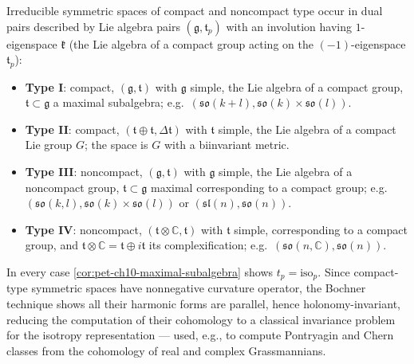 \begin{definition}
  \label{def:pet-ch10-symmetric-space-type-I-IV}
  Irreducible symmetric spaces of compact and noncompact type occur in dual
  pairs described by Lie algebra pairs $(\mathfrak g,\mathfrak t_p)$ with an
  involution having $1$-eigenspace $\mathfrak k$ (the Lie algebra of a compact
  group acting on the $(-1)$-eigenspace $\mathfrak t_p$):
  \begin{itemize}
    \item \textbf{Type I}: compact, $(\mathfrak g,\mathfrak t)$ with $\mathfrak g$
      simple, the Lie algebra of a compact group, $\mathfrak t\subset\mathfrak g$
      a maximal subalgebra; e.g.\ $(\mathfrak{so}(k+l),\mathfrak{so}(k)\times\mathfrak{so}(l))$.
    \item \textbf{Type II}: compact, $(\mathfrak t\oplus\mathfrak t,\Delta\mathfrak t)$
      with $\mathfrak t$ simple, the Lie algebra of a compact Lie group $G$; the
      space is $G$ with a biinvariant metric.
    \item \textbf{Type III}: noncompact, $(\mathfrak g,\mathfrak t)$ with
      $\mathfrak g$ simple, the Lie algebra of a noncompact group,
      $\mathfrak t\subset\mathfrak g$ maximal corresponding to a compact group;
      e.g.\ $(\mathfrak{so}(k,l),\mathfrak{so}(k)\times\mathfrak{so}(l))$ or
      $(\mathfrak{sl}(n),\mathfrak{so}(n))$.
    \item \textbf{Type IV}: noncompact, $(\mathfrak t\otimes\mathbb C,\mathfrak t)$
      with $\mathfrak t$ simple, corresponding to a compact group, and
      $\mathfrak t\otimes\mathbb C=\mathfrak t\oplus i\mathfrak t$ its
      complexification; e.g.\ $(\mathfrak{so}(n,\mathbb C),\mathfrak{so}(n))$.
  \end{itemize}
  In every case \cref{cor:pet-ch10-maximal-subalgebra} shows $t_p=\mathrm{iso}_p$.
  Since compact-type symmetric spaces have nonnegative curvature operator, the
  Bochner technique shows all their harmonic forms are parallel, hence
  holonomy-invariant, reducing the computation of their cohomology to a
  classical invariance problem for the isotropy representation — used, e.g., to
  compute Pontryagin and Chern classes from the cohomology of real and complex
  Grassmannians.
\end{definition}

